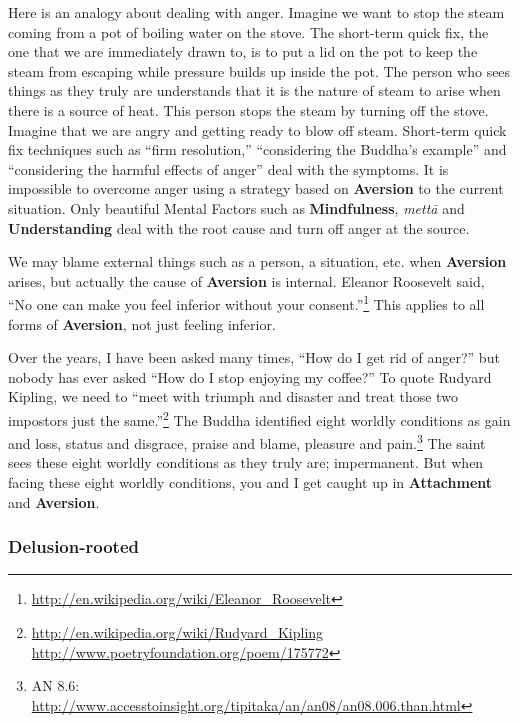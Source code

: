 Here is an analogy about dealing with anger. Imagine we want to stop the steam coming from a pot of boiling water on the stove. The short-term quick fix, the one that we are immediately drawn to, is to put a lid on the pot to keep the steam from escaping while pressure builds up inside the pot. The person who sees things as they truly are understands that it is the nature of steam to arise when there is a source of heat. This person stops the steam by turning off the stove. Imagine that we are angry and getting ready to blow off steam. Short-term quick fix techniques such as “firm resolution,” “considering the Buddha’s example” and “considering the harmful effects of anger” deal with the symptoms. It is impossible to overcome anger using a strategy based on \textbf{Aversion} to the current situation. Only beautiful Mental Factors such as \textbf{Mindfulness}, \textit{mettā} and \textbf{Understanding} deal with the root cause and turn off anger at the source.

We may blame external things such as a person, a situation, etc. when \textbf{Aversion} arises, but actually the cause of \textbf{Aversion} is internal. Eleanor Roosevelt said, “No one can make you feel inferior without your consent.”\footnote{\url{http://en.wikipedia.org/wiki/Eleanor_Roosevelt}} This applies to all forms of \textbf{Aversion}, not just feeling inferior.

Over the years, I have been asked many times, “How do I get rid of anger?” but nobody has ever asked “How do I stop enjoying my coffee?” To quote Rudyard Kipling, we need to “meet with triumph and disaster and treat those two impostors just the same.”\footnote{\url{http://en.wikipedia.org/wiki/Rudyard_Kipling} \newline \url{http://www.poetryfoundation.org/poem/175772}} The Buddha identified eight worldly conditions as gain and loss, status and disgrace, praise and blame, pleasure and pain.\footnote{AN 8.6: \url{http://www.accesstoinsight.org/tipitaka/an/an08/an08.006.than.html}} The saint sees these eight worldly conditions as they truly are; impermanent. But when facing these eight worldly conditions, you and I get caught up in \textbf{Attachment} and \textbf{Aversion}.

\subsubsection*{\textbf{Delusion}-rooted}

